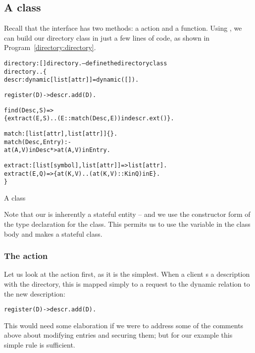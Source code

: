 \subsection{A  class}
Recall that the  interface has two methods: a  action and a  function. Using , we can build our directory class in just a few lines of code, as shown in Program~\vref{directory:directory}.
\begin{program}[tb]
\vspace{0.5ex}
\begin{alltt}
directory:[]\sconarrow{}directory.    -- define the directory class
directory..\{
  descr:dynamic[list[attr]] = dynamic([]).
  
  register(D) -> descr.add(D).
  
  find(Desc,S) =>
    \{ extract(E,S) .. (E::match(Desc,E)) in descr.ext() \}.
    
  match:[list[attr],list[attr]]\{\}.
  match(Desc,Entry) :-
    at(A,V) in Desc *> at(A,V) in Entry.
  
  extract:[list[symbol],list[attr]]=>list[attr].
  extract(E,Q) => \{ at(K,V) .. (at(K,V)::K in Q) in E \}.
\}
\end{alltt}
\vspace{-2ex}
\caption{A  class}
\label{directory:directory}
\end{program}
Note that our  is inherently a stateful entity -- and we use the \sconarrow{} constructor form of the type declaration for the  class. This permits us to use the  variable in the class body and makes  a stateful class.

\subsubsection{The  action}
Let us look at the  action first, as it is the simplest. When a client s a description with the directory, this is mapped simply to a request to the  dynamic relation to  the new description:
\begin{alltt}
register(D) -> descr.add(D).
\end{alltt}
This would need some elaboration if we were to address some of the comments above about modifying entries and securing them; but for our example this simple rule is sufficient.

